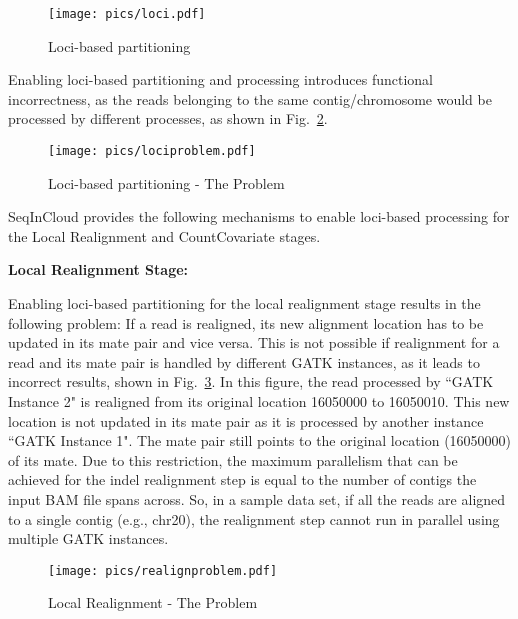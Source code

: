 \begin{figure}[!htb]
  \centering
  \texttt{[image: pics/loci.pdf]}
  \caption{Loci-based partitioning}
  \label{fig:loci}
\end{figure}

Enabling loci-based partitioning and processing introduces functional incorrectness, as the reads belonging to the same contig/chromosome would be processed by different processes, as shown in Fig.~\ref{fig:lociproblem}. 

\begin{figure}[!htb]
  \centering
  \texttt{[image: pics/lociproblem.pdf]}
  \caption{Loci-based partitioning - The Problem}
  \label{fig:lociproblem}
\end{figure}

SeqInCloud provides the following mechanisms to enable loci-based processing for the Local Realignment and CountCovariate stages. 

\textbf{Local Realignment Stage: }

Enabling loci-based partitioning for the local realignment stage results in the following problem: If a read is realigned, its new alignment location has to be updated in its mate pair and vice versa. This is not possible if realignment for a read and its mate pair is handled by different GATK instances, as it leads to incorrect results, shown in Fig.~\ref{fig:realignproblem}. In this figure, the read processed by ``GATK Instance 2" is realigned from its original location 16050000 to 16050010. This new location is not updated in its mate pair as it is processed by another instance ``GATK Instance 1". The mate pair still points to the original location (16050000) of its mate. Due to this restriction, the maximum parallelism that can be achieved for the indel realignment step is equal to the number of contigs the input BAM file spans across. So, in a sample data set, if all the reads are aligned to a single contig (e.g., chr20), the realignment step cannot run in parallel using multiple GATK instances. 

\begin{figure}[!htb]
  \centering
  \texttt{[image: pics/realignproblem.pdf]}
  \caption{Local Realignment - The Problem}
  \label{fig:realignproblem}
\end{figure}

